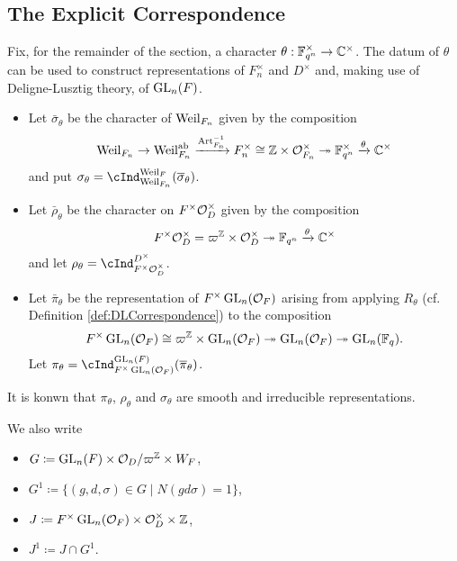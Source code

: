 \documentclass[../main.tex]{subfiles}
\begin{document}
\subsection{The Explicit Correspondence} %
\label{sub:The Explicit Correspondence}
Fix, for the remainder of the section, a character $\theta: \mathbb{F}_{q^n}^\times
\to \mathbb{C}^\times$.
The datum of $\theta$ can be used to construct representations 
of $F_n^\times$ and $D^\times$ and, making use of Deligne-Lusztig
theory, of $\operatorname{GL}_n(F)$.
\begin{itemize}
  \item Let $\bar \sigma_\theta$ be the character of $\operatorname{Weil}_{F_n}$ given by 
    the composition
    \begin{equation*}
      \operatorname{Weil}_{F_n} \to \operatorname{Weil}_{F_n}^{\mathrm{ab}} \xrightarrow{\operatorname{Art}_{F_n}^{-1}} F_n^\times \cong
      \mathbb{Z} \times \mathcal{O}_{F_n}^\times \twoheadrightarrow \mathbb{F}_{q^n}^\times \xrightarrow{\theta} \mathbb{C}^\times
    \end{equation*}
  and put $\sigma_\theta = \cInd_{\Weil_{F_n}}^{\Weil_F}(\bar \sigma_\theta)$.
  \item Let $\bar \rho_\theta$ be the character on 
    $F^\times \mathcal{O}_D^\times$ given by the composition
    \begin{equation*}
      F^\times\mathcal{O}_D^\times = \varpi^{\mathbb{Z}} \times \mathcal{O}_D^\times \twoheadrightarrow 
      \mathbb{F}_{q^n} \xrightarrow{\theta} \mathbb{C}^\times
    \end{equation*}
    and let $\rho_\theta = \cInd_{F^\times \cO_D^\times}^{D^\times}$. 
  \item Let $\bar \pi_\theta$ be the representation of $F^\times \operatorname{GL}_n(\mathcal{O}_F)$
    arising from applying $R_\theta$ (cf. Definition
    \ref{def:DLCorrespondence}) to the composition
    \begin{equation*}
      F^\times \operatorname{GL}_n(\mathcal{O}_F) \cong \varpi^{\mathbb{Z}} \times \operatorname{GL}_n(\mathcal{O}_F)
      \twoheadrightarrow \operatorname{GL}_n(\mathcal{O}_F) \twoheadrightarrow \operatorname{GL}_n(\mathbb{F}_q).
    \end{equation*}
    Let $\pi_\theta = \cInd_{F^\times \GL_n(\cO_F)}^{\GL_n(F)}(\bar \pi_\theta)$. 
\end{itemize}
It is konwn that $\pi_\theta$, $\rho_\theta$ and $\sigma_\theta$ are smooth and 
irreducible representations. 

We also write
\begin{itemize}
  \item $G \coloneqq \operatorname{GL}_n(F) \times \mathcal{O}_D/\varpi^{\mathbb{Z}} \times W_F$,
  \item $G^1 \coloneqq \{(g,d,\sigma) \in G \mid N(gd\sigma) = 1\}$,
  \item $J \coloneqq F^\times \operatorname{GL}_n(\mathcal{O}_F) \times \mathcal{O}_D^\times \times \mathbb{Z}$,
  \item $J^1 \coloneqq J \cap G^1$. 
\end{itemize}



\end{document}
